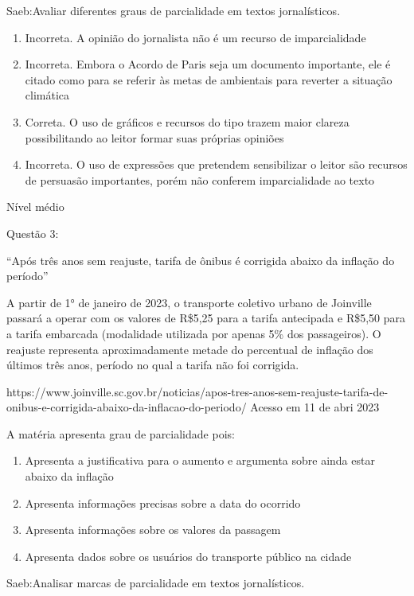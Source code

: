 {Saeb:Avaliar diferentes graus de parcialidade em textos jornalísticos.

\begin{enumerate}
\def\labelenumi{\arabic{enumi}.}
\item
  Incorreta. A opinião do jornalista não é um recurso de imparcialidade
\item
  Incorreta. Embora o Acordo de Paris seja um documento importante, ele
  é citado como para se referir às metas de ambientais para reverter a
  situação climática
\item
  Correta. O uso de gráficos e recursos do tipo trazem maior clareza
  possibilitando ao leitor formar suas próprias opiniões
\item
  Incorreta. O uso de expressões que pretendem sensibilizar o leitor são
  recursos de persuasão importantes, porém não conferem imparcialidade
  ao texto
\end{enumerate}

Nível médio

Questão 3:

``Após três anos sem reajuste, tarifa de ônibus é corrigida abaixo da
inflação do período''

A partir de 1° de janeiro de 2023, o transporte coletivo urbano de
Joinville passará a operar com os valores de R\$5,25 para a tarifa
antecipada e R\$5,50 para a tarifa embarcada (modalidade utilizada por
apenas 5\% dos passageiros). O reajuste representa aproximadamente
metade do percentual de inflação dos últimos três anos, período no qual
a tarifa não foi corrigida.

https://www.joinville.sc.gov.br/noticias/apos-tres-anos-sem-reajuste-tarifa-de-onibus-e-corrigida-abaixo-da-inflacao-do-periodo/
Acesso em 11 de abri 2023

A matéria apresenta grau de parcialidade pois:

\begin{enumerate}
\def\labelenumi{\alph{enumi})}
\item
  Apresenta a justificativa para o aumento e argumenta sobre ainda estar
  abaixo da inflação
\item
  Apresenta informações precisas sobre a data do ocorrido
\item
  Apresenta informações sobre os valores da passagem
\item
  Apresenta dados sobre os usuários do transporte público na cidade
\end{enumerate}

Saeb:Analisar marcas de parcialidade em textos jornalísticos.

}
